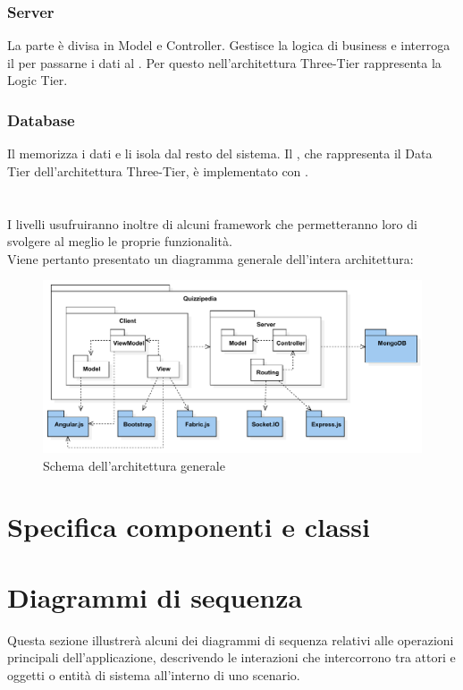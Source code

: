 \documentclass[a4paper, titlepage]{article}
\begin{document}
	\subsubsection{Server}
	La parte  è divisa in Model e Controller. Gestisce la logica di business e interroga il  per passarne i dati al . Per questo nell'architettura Three-Tier rappresenta la Logic Tier.
	
	\subsubsection{Database}
	Il  memorizza i dati e li isola dal resto del sistema. Il , che rappresenta il Data Tier dell'architettura Three-Tier, è implementato con .
	\\ \\ \\I livelli usufruiranno inoltre di alcuni framework che permetteranno loro di svolgere al meglio le proprie funzionalità.
	\\Viene pertanto presentato un diagramma generale dell'intera architettura:
\begin{figure}[!h]
	\centering
	\includegraphics[scale=0.75]{Img/quizzipedia-generale.pdf}
	\caption{Schema dell'architettura generale}
\end{figure}

\newpage
\section{Specifica componenti e classi}


\newpage
\section{Diagrammi di sequenza}
Questa sezione illustrerà alcuni dei diagrammi di sequenza relativi alle operazioni principali
dell'applicazione, descrivendo le interazioni che intercorrono tra attori e oggetti o entità di
sistema all'interno di uno scenario.
\end{document}
